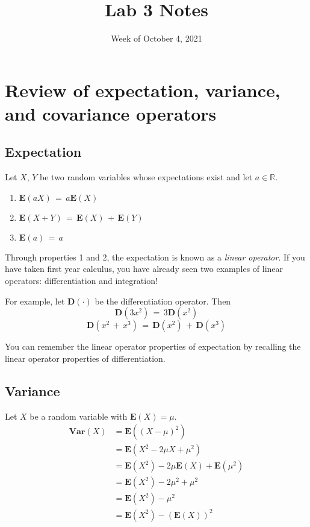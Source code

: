 \documentclass[11pt,letterpaper]{article}
\title{Lab 3 Notes}
\author{}
\date{Week of October 4, 2021}
\newcommand{\E}[1]{\mathbf{E}\left(#1\right)}
\newcommand{\Var}[1]{\mathbf{Var}\left(#1\right)}
\newcommand{\blue}[1]{{\color{blue}#1}}
\begin{document}
\maketitle

\section*{\blue{Review of expectation, variance, and covariance operators}}

\subsection*{\blue{Expectation}}

Let $X$, $Y$ be two random variables whose expectations exist and let $a \in \mathbb{R}$.

\begin{enumerate}
\item $\E{aX} \,=\, a\E{X}$
\item $\E{X+Y} \,=\, \E{X} \,+\, \E{Y}$
\item $\E{a} \,=\, a$
\end{enumerate}

Through properties 1 and 2, the expectation is known as a \textit{linear operator}. If you have taken first year calculus,
you have already seen two examples of linear operators: differentiation and integration!

For example, let $\mathbf{D}(\cdot)$ be the differentiation operator. Then
\[\mathbf{D}(3x^{2}) \,=\, 3\mathbf{D}(x^{2})\]
\[\mathbf{D}(x^{2} \,+\, x^{3}) \,=\, \mathbf{D}(x^{2}) \,+\, \mathbf{D}(x^{3})\]

You can remember the linear operator properties of expectation by recalling the linear operator properties of differentiation.


\subsection*{\blue{Variance}}

Let $X$ be a random variable with $\E{X} = \mu$.
\begin{align*}
\Var{X} &= \E{\left(X - \mu\right)^{2}}\\[2mm]
&= \E{X^{2} - 2\mu X + \mu^{2}}\\[2mm]
&= \E{X^{2}} - 2\mu\E{X} + \E{\mu^{2}}\\[2mm]
&= \E{X^{2}} - 2\mu^{2} + \mu^{2}\\[2mm]
&= \E{X^{2}} - \mu^{2}\\[2mm]
&= \E{X^{2}} - \left(\E{X}\right)^{2}
\end{align*}
\end{document}

